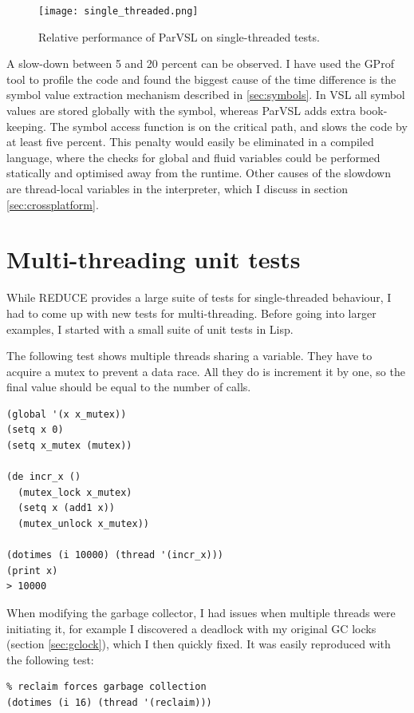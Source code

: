 \begin{figure}[h]
  \centering
  \texttt{[image: single\_threaded.png]}
  \caption{Relative performance of ParVSL on single-threaded tests.}
  \label{fig:single-threaded}
\end{figure}


A slow-down between 5 and 20 percent can be observed. I have used the GProf \cite{gprof}
tool to profile the code and found the biggest cause of the time difference is the
symbol value extraction mechanism described in \ref{sec:symbols}. In VSL all symbol
values are stored globally with the symbol, whereas ParVSL adds extra book-keeping.
The symbol access function is on the critical path, and slows the code by at least
five percent. This penalty would easily be eliminated in a compiled language, where the
checks for global and fluid variables could be performed statically and optimised away
from the runtime. Other causes of the slowdown are thread-local variables in the interpreter,
which I discuss in section \ref{sec:crossplatform}.

\section{Multi-threading unit tests}

While REDUCE provides a large suite of tests for single-threaded behaviour, I had to come
up with new tests for multi-threading. Before going into larger examples, I started with a small
suite of unit tests in Lisp.

The following test shows multiple threads sharing a variable. They have to acquire
a mutex to prevent a data race. All they do is increment it by one, so the final
value should be equal to the number of calls.

\label{lst:shared-global}
\begin{verbatim}
(global '(x x_mutex))
(setq x 0)
(setq x_mutex (mutex))

(de incr_x ()
  (mutex_lock x_mutex)
  (setq x (add1 x))
  (mutex_unlock x_mutex))

(dotimes (i 10000) (thread '(incr_x)))
(print x)
> 10000
\end{verbatim}

When modifying the garbage collector, I had issues when multiple
threads were initiating it, for example I discovered a deadlock
with my original GC locks (section \ref{sec:gclock}), which I then
quickly fixed. It was easily reproduced with the following test:

\label{lst:multi-gc}
\begin{verbatim}
% reclaim forces garbage collection
(dotimes (i 16) (thread '(reclaim)))
\end{verbatim}

